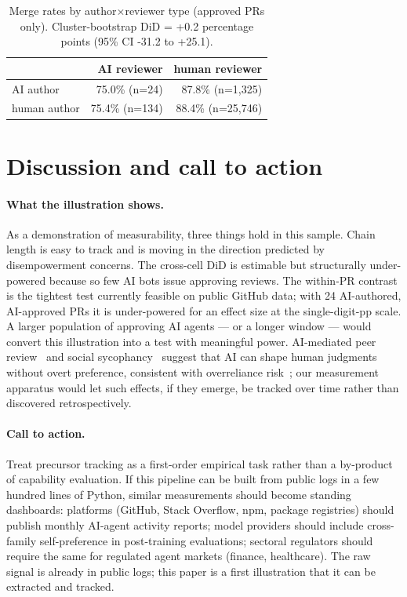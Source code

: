 \documentclass{article}
\begin{document}
\begin{table}[t]
\centering\footnotesize
\caption{Merge rates by author$\times$reviewer type (approved PRs only). Cluster-bootstrap DiD = +0.2{} percentage points (95\% CI -31.2{} to +25.1{}).}
\label{tab:did}
\begin{tabular}{@{}lrr@{}}
\toprule
 & AI reviewer & human reviewer \\
\midrule
AI author & 75.0\%{} (n=24{}) & 87.8\%{} (n=1,325{}) \\
human author & 75.4\%{} (n=134{}) & 88.4\%{} (n=25,746{}) \\
\bottomrule
\end{tabular}
\end{table}

\section{Discussion and call to action}
\label{sec:discuss}

\paragraph{What the illustration shows.} As a demonstration of measurability, three things hold in this sample. Chain length is easy to track and is moving in the direction predicted by disempowerment concerns. The cross-cell DiD is estimable but structurally under-powered because so few AI bots issue approving reviews. The within-PR contrast is the tightest test currently feasible on public GitHub data; with 24{} AI-authored, AI-approved PRs it is under-powered for an effect size at the single-digit-pp scale. A larger population of approving AI agents --- or a longer window --- would convert this illustration into a test with meaningful power. AI-mediated peer review~\citep{thakkar2025iclr} and social sycophancy~\citep{cheng2025elephant} suggest that AI can shape human judgments without overt preference, consistent with overreliance risk~\citep{ibrahim2025anthropomorphic}; our measurement apparatus would let such effects, if they emerge, be tracked over time rather than discovered retrospectively.

\paragraph{Call to action.} Treat precursor tracking as a first-order empirical task rather than a by-product of capability evaluation. If this pipeline can be built from public logs in a few hundred lines of Python, similar measurements should become standing dashboards: platforms (GitHub, Stack Overflow, npm, package registries) should publish monthly AI-agent activity reports; model providers should include cross-family self-preference in post-training evaluations; sectoral regulators should require the same for regulated agent markets (finance, healthcare). The raw signal is already in public logs; this paper is a first illustration that it can be extracted and tracked.
\end{document}
